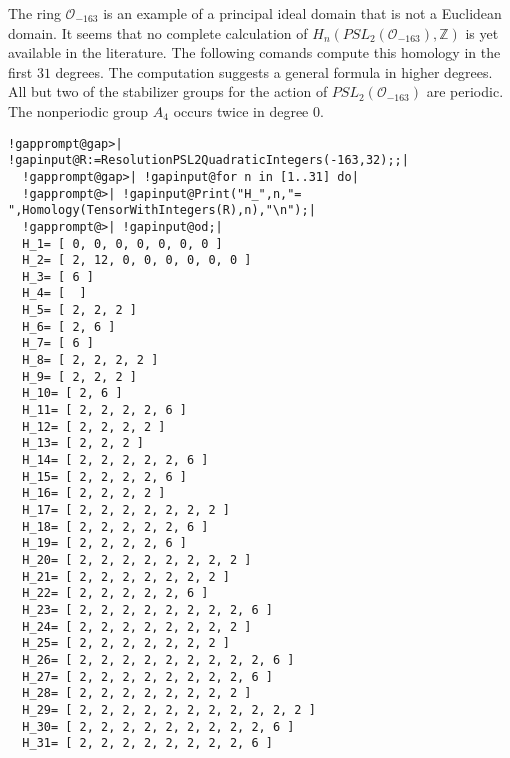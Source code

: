 \documentclass[a4paper,11pt]{report}
\begin{document}
{{\begin{Verbatim}[commandchars=!@|,fontsize=\small,frame=single,label=Example]
\end{Verbatim}
 The ring ${\mathcal O}_{-163}$ is an example of a principal ideal domain that is not a Euclidean domain. It
seems that no complete calculation of $H_n(PSL_2({\mathcal O}_{-163}),\mathbb Z)$ is yet available in the literature. The following comands compute this
homology in the first $31$ degrees. The computation suggests a general formula in higher degrees. All but
two of the stabilizer groups for the action of $PSL_2({\mathcal O}_{-163})$ are periodic. The non\texttt{}periodic group $A_4$ occurs twice in degree $0$. 
\begin{Verbatim}[commandchars=!@|,fontsize=\small,frame=single,label=Example]
  !gapprompt@gap>| !gapinput@R:=ResolutionPSL2QuadraticIntegers(-163,32);;|
  !gapprompt@gap>| !gapinput@for n in [1..31] do|
  !gapprompt@>| !gapinput@Print("H_",n,"= ",Homology(TensorWithIntegers(R),n),"\n");|
  !gapprompt@>| !gapinput@od;|
  H_1= [ 0, 0, 0, 0, 0, 0, 0 ]
  H_2= [ 2, 12, 0, 0, 0, 0, 0, 0 ]
  H_3= [ 6 ]
  H_4= [  ]
  H_5= [ 2, 2, 2 ]
  H_6= [ 2, 6 ]
  H_7= [ 6 ]
  H_8= [ 2, 2, 2, 2 ]
  H_9= [ 2, 2, 2 ]
  H_10= [ 2, 6 ]
  H_11= [ 2, 2, 2, 2, 6 ]
  H_12= [ 2, 2, 2, 2 ]
  H_13= [ 2, 2, 2 ]
  H_14= [ 2, 2, 2, 2, 2, 6 ]
  H_15= [ 2, 2, 2, 2, 6 ]
  H_16= [ 2, 2, 2, 2 ]
  H_17= [ 2, 2, 2, 2, 2, 2, 2 ]
  H_18= [ 2, 2, 2, 2, 2, 6 ]
  H_19= [ 2, 2, 2, 2, 6 ]
  H_20= [ 2, 2, 2, 2, 2, 2, 2, 2 ]
  H_21= [ 2, 2, 2, 2, 2, 2, 2 ]
  H_22= [ 2, 2, 2, 2, 2, 6 ]
  H_23= [ 2, 2, 2, 2, 2, 2, 2, 2, 6 ]
  H_24= [ 2, 2, 2, 2, 2, 2, 2, 2 ]
  H_25= [ 2, 2, 2, 2, 2, 2, 2 ]
  H_26= [ 2, 2, 2, 2, 2, 2, 2, 2, 2, 6 ]
  H_27= [ 2, 2, 2, 2, 2, 2, 2, 2, 6 ]
  H_28= [ 2, 2, 2, 2, 2, 2, 2, 2 ]
  H_29= [ 2, 2, 2, 2, 2, 2, 2, 2, 2, 2, 2 ]
  H_30= [ 2, 2, 2, 2, 2, 2, 2, 2, 2, 6 ]
  H_31= [ 2, 2, 2, 2, 2, 2, 2, 2, 6 ]
  
\end{Verbatim}
 }

 
}
\end{document}

